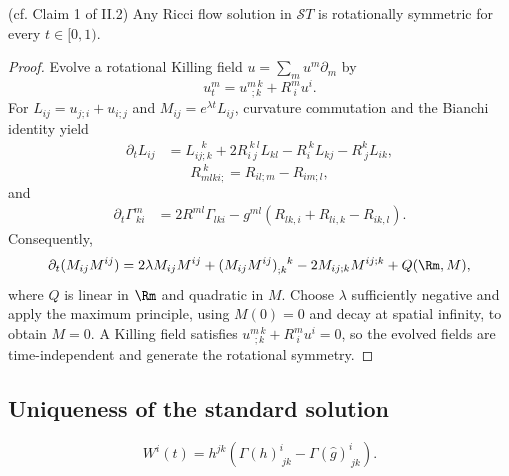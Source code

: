 \begin{lemma}
  \label{lem:kl-rotational-symmetry-standard-solutions-standard-solutions-lemma}
 (cf. Claim 1 of II.2)
Any Ricci flow solution in ${\mathcal ST}$ is rotationally symmetric for every
$t\in[0,1)$.
\end{lemma}
\begin{proof}
\sketch Evolve a rotational Killing field $u=\sum_m u^m\partial_m$ by
\begin{equation} \label{Killingevolution}
u_t^m=u^{m\,k}_{\ \ ;k}+R^m_{\ i}u^i.
\end{equation}
For $L_{ij}=u_{j;i}+u_{i;j}$ and $M_{ij}=e^{\lambda t}L_{ij}$, curvature
commutation and the Bianchi identity yield
\begin{align} \label{bigmess1}
\partial_tL_{ij}&=L_{ij;k}^{\ \ \ k}+2R^{\ k\ l}_{i\ j}L_{kl}-R_i^{\ k}L_{kj}-R^k_{\ j}L_{ik},
\end{align}
\begin{equation} \label{bigmess2}
R_{mlki;}^{\ k}=R_{il;m}-R_{im;l},
\end{equation}
and
\begin{align} \label{bigmess3}
\partial_t\Gamma^m_{\ ki}&=2R^{ml}\Gamma_{lki}-g^{ml}(R_{lk,i}+R_{li,k}-R_{ik,l}).
\end{align}
Consequently,
\begin{equation} \label{M2}
\partial_t(M_{ij}M^{ij})=2\lambda M_{ij}M^{ij}+(M_{ij}M^{ij})_{;k}^{\ \ k}
-2M_{ij;k}M^{ij;k}+Q(\Rm,M),
\end{equation}
where $Q$ is linear in $\Rm$ and quadratic in $M$. Choose $\lambda$ sufficiently
negative and apply the maximum principle, using $M(0)=0$ and decay at spatial
infinity, to obtain $M=0$. A Killing field satisfies
$u^{m\,k}_{\ \ ;k}+R^m_{\ i}u^i=0$, so the evolved fields are time-independent
and generate the rotational symmetry.
\end{proof}

\subsection{Uniqueness of the standard solution}
 \label{claim3}

\begin{equation} \label{Weqn}
W^i(t)=h^{jk}\left(\Gamma(h)^i_{\ jk}-\Gamma(\widehat g)^i_{\ jk}\right).
\end{equation}

